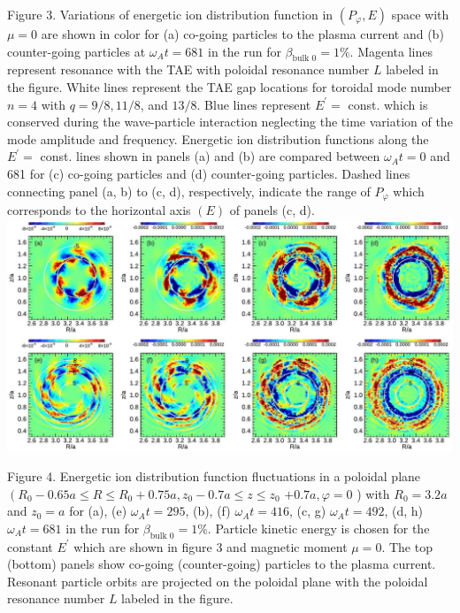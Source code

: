 \documentclass[10pt]{article}
\begin{document}
Figure 3. Variations of energetic ion distribution function in $\left(P_{\varphi}, E\right)$ space with $\mu=0$ are shown in color for (a) co-going particles to the plasma current and (b) counter-going particles at $\omega_{A} t=681$ in the run for $\beta_{\text {bulk } 0}=1 \%$. Magenta lines represent resonance with the TAE with poloidal resonance number $L$ labeled in the figure. White lines represent the TAE gap locations for toroidal mode number $n=4$ with $q=9 / 8,11 / 8$, and $13 / 8$. Blue lines represent $E^{\prime}=$ const. which is conserved during the wave-particle interaction neglecting the time variation of the mode amplitude and frequency. Energetic ion distribution functions along the $E^{\prime}=$ const. lines shown in panels (a) and (b) are compared between $\omega_{A} t=0$ and 681 for (c) co-going particles and (d) counter-going particles. Dashed lines connecting panel (a, b) to (c, d), respectively, indicate the range of $P_{\varphi}$ which corresponds to the horizontal axis $(E)$ of panels (c, d).
\includegraphics[max width=\textwidth, center]{2023_06_04_de2f4b8aa3fd859f006dg-07(1)}

Figure 4. Energetic ion distribution function fluctuations in a poloidal plane $\left(R_{0}-0.65 a \leqslant R \leqslant R_{0}+0.75 a, z_{0}-0.7 a \leqslant z \leqslant z_{0}\right.$ $+0.7 a, \varphi=0$ ) with $R_{0}=3.2 a$ and $z_{0}=a$ for (a), (e) $\omega_{A} t=295$, (b), (f) $\omega_{A} t=416$, (c, g) $\omega_{A} t=492$, (d, h) $\omega_{A} t=681$ in the run for $\beta_{\text {bulk } 0}=1 \%$. Particle kinetic energy is chosen for the constant $E^{\prime}$ which are shown in figure 3 and magnetic moment $\mu=0$. The top (bottom) panels show co-going (counter-going) particles to the plasma current. Resonant particle orbits are projected on the poloidal plane with the poloidal resonance number $L$ labeled in the figure.
\end{document}
